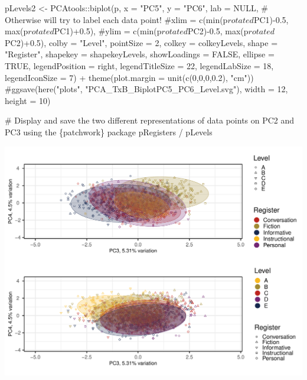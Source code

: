 \documentclass[
  letterpaper,
  DIV=11,
  numbers=noendperiod]{scrreprt}
\newenvironment{Shaded}{\begin{snugshade}}{\end{snugshade}}
\newcommand{\AttributeTok}[1]{\textcolor[rgb]{0.40,0.45,0.13}{#1}}
\newcommand{\CommentTok}[1]{\textcolor[rgb]{0.37,0.37,0.37}{#1}}
\newcommand{\ConstantTok}[1]{\textcolor[rgb]{0.56,0.35,0.01}{#1}}
\newcommand{\DecValTok}[1]{\textcolor[rgb]{0.68,0.00,0.00}{#1}}
\newcommand{\FloatTok}[1]{\textcolor[rgb]{0.68,0.00,0.00}{#1}}
\newcommand{\FunctionTok}[1]{\textcolor[rgb]{0.28,0.35,0.67}{#1}}
\newcommand{\NormalTok}[1]{\textcolor[rgb]{0.00,0.23,0.31}{#1}}
\newcommand{\OtherTok}[1]{\textcolor[rgb]{0.00,0.23,0.31}{#1}}
\newcommand{\SpecialCharTok}[1]{\textcolor[rgb]{0.37,0.37,0.37}{#1}}
\newcommand{\StringTok}[1]{\textcolor[rgb]{0.13,0.47,0.30}{#1}}
\begin{document}
\begin{Shaded}
\begin{Highlighting}[]
\NormalTok{pLevels2 }\OtherTok{\textless{}{-}}\NormalTok{ PCAtools}\SpecialCharTok{::}\FunctionTok{biplot}\NormalTok{(p,}
                 \AttributeTok{x =} \StringTok{"PC5"}\NormalTok{,}
                 \AttributeTok{y =} \StringTok{"PC6"}\NormalTok{,}
                 \AttributeTok{lab =} \ConstantTok{NULL}\NormalTok{, }\CommentTok{\# Otherwise will try to label each data point!}
                 \CommentTok{\#xlim = c(min(p$rotated$PC1){-}0.5, max(p$rotated$PC1)+0.5),}
                 \CommentTok{\#ylim = c(min(p$rotated$PC2){-}0.5, max(p$rotated$PC2)+0.5),}
                 \AttributeTok{colby =} \StringTok{"Level"}\NormalTok{,}
                 \AttributeTok{pointSize =} \DecValTok{2}\NormalTok{,}
                 \AttributeTok{colkey =}\NormalTok{ colkeyLevels,}
                 \AttributeTok{shape =} \StringTok{"Register"}\NormalTok{,}
                 \AttributeTok{shapekey =}\NormalTok{ shapekeyLevels,}
                 \AttributeTok{showLoadings =} \ConstantTok{FALSE}\NormalTok{,}
                 \AttributeTok{ellipse =} \ConstantTok{TRUE}\NormalTok{,}
                 \AttributeTok{legendPosition =} \StringTok{\textquotesingle{}right\textquotesingle{}}\NormalTok{,}
                 \AttributeTok{legendTitleSize =} \DecValTok{22}\NormalTok{,}
                 \AttributeTok{legendLabSize =} \DecValTok{18}\NormalTok{, }
                 \AttributeTok{legendIconSize =} \DecValTok{7}\NormalTok{) }\SpecialCharTok{+}
  \FunctionTok{theme}\NormalTok{(}\AttributeTok{plot.margin =} \FunctionTok{unit}\NormalTok{(}\FunctionTok{c}\NormalTok{(}\DecValTok{0}\NormalTok{,}\DecValTok{0}\NormalTok{,}\DecValTok{0}\NormalTok{,}\FloatTok{0.2}\NormalTok{), }\StringTok{"cm"}\NormalTok{))}
\CommentTok{\#ggsave(here("plots", "PCA\_TxB\_BiplotPC5\_PC6\_Level.svg"), width = 12, height = 10)}


\CommentTok{\# Display and save the two different representations of data points on PC2 and PC3 using the \{patchwork\} package}
\NormalTok{pRegisters }\SpecialCharTok{/}\NormalTok{ pLevels}
\end{Highlighting}
\end{Shaded}

\includegraphics{E_Ch6_Analysis_files/figure-pdf/PCAtools-biplots-TxB-Levels-1.pdf}
\end{document}
